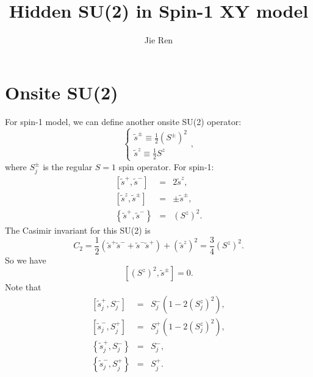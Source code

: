 \documentclass[aps,prb,superscriptaddress]{revtex4}
\begin{document}
\title{Hidden SU(2) in Spin-1 XY model}
\author{Jie Ren}
\maketitle

\section{Onsite SU(2)}

For spin-1 model, we can define another onsite SU(2) operator:
\begin{equation}
\begin{cases}
\tilde{s}^{\pm}\equiv\frac{1}{2}\left(S^{\pm}\right)^{2}\\
\tilde{s}^{z}\equiv\frac{1}{2}S^{z}
\end{cases},
\end{equation}
where $S_{j}^{\pm}$ is the regular $S=1$ spin operator. For spin-1:
\begin{eqnarray}
\left[\tilde{s}^{+},\tilde{s}^{-}\right] & = & 2\tilde{s}^{z},\\
\left[\tilde{s}^{z},\tilde{s}^{\pm}\right] & = & \pm\tilde{s}^{\pm},\\
\left\{ \tilde{s}^{+},\tilde{s}^{-}\right\}  & = & \left(S^{z}\right)^{2}.
\end{eqnarray}
The Casimir invariant for this SU(2) is
\begin{equation}
C_{2}=\frac{1}{2}\left(\tilde{s}^{+}\tilde{s}^{-}+\tilde{s}^{-}\tilde{s}^{+}\right)+\left(\tilde{s}^{z}\right)^{2}=\frac{3}{4}\left(S^{z}\right)^{2}.
\end{equation}
So we have
\begin{equation}
\left[\left(S^{z}\right)^{2},\tilde{s}^{\pm}\right]=0.
\end{equation}
Note that
\begin{eqnarray}
\left[\tilde{s}_{j}^{+},S_{j}^{-}\right] & = & S_{j}^{-}\left(1-2\left(S_{j}^{z}\right)^{2}\right),\\
\left[\tilde{s}_{j}^{-},S_{j}^{+}\right] & = & S_{j}^{+}\left(1-2\left(S_{j}^{z}\right)^{2}\right),\\
\left\{ \tilde{s}_{j}^{+},S_{j}^{-}\right\}  & = & S_{j}^{-},\\
\left\{ \tilde{s}_{j}^{-},S_{j}^{+}\right\}  & = & S_{j}^{+}.
\end{eqnarray}
\end{document}
